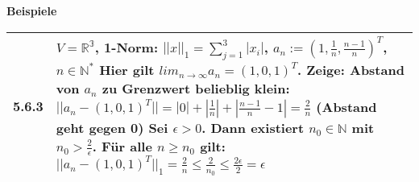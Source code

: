 \noindent
\textbf{Beispiele}
\begin{table}[h]
\begin{tabularx}{\textwidth}{X m{16cm}}
    \toprule

    5.6.3 & $V = \mathbb{R^3}$, 1-Norm: $||x||_1 = \sum^3_{j=1} |x_i|$, $a_n := (1, \frac{1}{n}, \frac{n-1}{n})^T$, $n \in \mathbb{N^*}$ \hfill \break
            Hier gilt $lim_{n \rightarrow \infty} a_n = (1,0,1)^T$. Zeige: Abstand von $a_n$ zu Grenzwert belieblig klein: \hfill \break
            $||a_n - (1,0,1)^T|| = |0| + |\frac{1}{n}| + |\frac{n-1}{n}-1| = \frac{2}{n}$ (Abstand geht gegen 0) \hfill \break
            Sei $\epsilon > 0$. Dann existiert $n_0 \in \mathbb{N}$ mit $n_0 > \frac{2}{\epsilon}$. Für alle $n \geq n_0$ gilt: \hfill \break
            $||a_n - (1,0,1)^T||_1 = \frac{2}{n} \leq \frac{2}{n_0} \leq \frac{2\epsilon}{2} = \epsilon$ \\

    \bottomrule
\end{tabularx}
\end{table}

